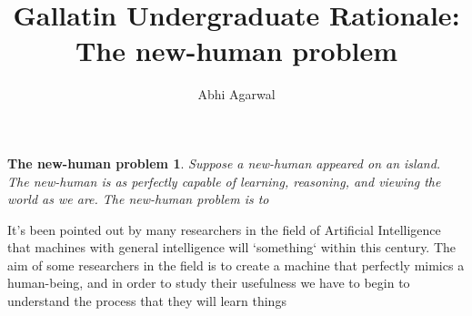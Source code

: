 \documentclass[12pt]{article}
\title{Gallatin Undergraduate Rationale: The new-human problem}
\author{Abhi Agarwal}
\date{}
\newtheorem*{nhp-definition}{The new-human problem}
\begin{document}
\maketitle

\begin{nhp-definition}
Suppose a new-human appeared on an island. The new-human is as perfectly capable of learning, reasoning, and viewing the world as we are. The new-human problem is to 
\end{nhp-definition}

\par It's been pointed out by many researchers in the field of Artificial Intelligence that machines with general intelligence will `something` within this century. The aim of some researchers in the field is to create a machine that perfectly mimics a human-being, and in order to study their usefulness we have to begin to understand the process that they will learn things 
\par 
\end{document}
